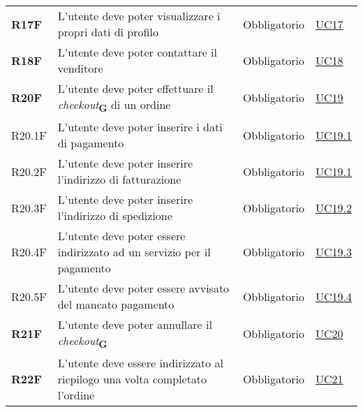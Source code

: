 \begin{center}
\begin{longtable}[!h]{p{50px} p{245px} p{75px} p{50px}}
        \textbf{R17F}                         & L'utente deve poter visualizzare i propri dati di profilo                                           & Obbligatorio             & \hyperref[sec:UC17]{UC17}                    \\
        \textbf{R18F}                         & L'utente deve poter contattare il venditore                                                         & Obbligatorio             & \hyperref[sec:UC18]{UC18}                    \\
        \textbf{R20F}                         & L'utente deve poter effettuare il \textit{checkout}\textsubscript{\textbf{G}} di un ordine                                             & Obbligatorio             & \hyperref[sec:UC19]{UC19}                    \\
        R20.1F                                & L'utente deve poter inserire i dati di pagamento                                                    & Obbligatorio             & \hyperref[sec:UC19.1]{UC19.1}                \\
        R20.2F                                & L'utente deve poter inserire l'indirizzo di fatturazione                                            & Obbligatorio             & \hyperref[sec:UC19.1]{UC19.1}                \\
        R20.3F                                & L'utente deve poter inserire l'indirizzo di spedizione                                              & Obbligatorio             & \hyperref[sec:UC19.2]{UC19.2}                \\
        R20.4F                                & L'utente deve poter essere indirizzato ad un servizio per il pagamento                              & Obbligatorio             & \hyperref[sec:UC19.3]{UC19.3}                \\
        R20.5F                                & L'utente deve poter essere avvisato del mancato pagamento                                           & Obbligatorio             & \hyperref[sec:UC19.4]{UC19.4}                \\
        \textbf{R21F}                         & L'utente deve poter annullare il \textit{checkout}\textsubscript{\textbf{G}}                                                           & Obbligatorio             & \hyperref[sec:UC20]{UC20}                    \\
        \textbf{R22F}                         & L'utente deve essere indirizzato al riepilogo una volta completato l'ordine                         & Obbligatorio             & \hyperref[sec:UC21]{UC21}                    \\

\end{longtable}
\end{center}
